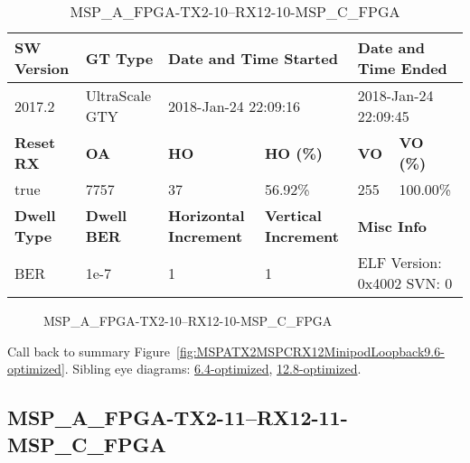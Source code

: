 \begin{table}[h]
\centering
\caption{MSP\_A\_FPGA-TX2-10--RX12-10-MSP\_C\_FPGA}
\label{tab:MSPAFPGATX210RX1210MSPCFPGA9.6-optimized}
\begin{tabular}{@{}|l|l|l|l|l|l|@{}}
\toprule
\textbf{SW Version}                & \textbf{GT Type}   & \multicolumn{2}{l|}{\textbf{Date and Time Started}}            & \multicolumn{2}{l|}{\textbf{Date and Time Ended}}        \\ \midrule
2017.2                       & UltraScale GTY          & \multicolumn{2}{l|}{2018-Jan-24 22:09:16}                   & \multicolumn{2}{l|}{2018-Jan-24 22:09:45}               \\ \midrule
\textbf{Reset RX}                  & \textbf{OA} & \textbf{HO}   & \textbf{HO (\%)} & \textbf{VO} & \textbf{VO (\%)} \\ \midrule
true & 7757        & 37          & 56.92\%        & 255        & 100.00\%       \\ \midrule
\textbf{Dwell Type}                & \textbf{Dwell BER} & \textbf{Horizontal Increment} & \textbf{Vertical Increment}    & \multicolumn{2}{l|}{\textbf{Misc Info}}                  \\ \midrule
BER                            & 1e-7        & 1        & 1           & \multicolumn{2}{l|}{ELF Version: 0x4002 SVN: 0}                         \\ \bottomrule
\end{tabular}
\end{table}

\begin{figure}[h]
\caption{MSP\_A\_FPGA-TX2-10--RX12-10-MSP\_C\_FPGA} \label{fig:MSPAFPGATX210RX1210MSPCFPGA9.6-optimized}
\end{figure}

Call back to summary Figure~\ref{fig:MSPATX2MSPCRX12MinipodLoopback9.6-optimized}.
Sibling eye diagrams: \hyperref[sec:MSPAFPGATX210RX1210MSPCFPGA6.4-optimized]{6.4-optimized}, \hyperref[sec:MSPAFPGATX210RX1210MSPCFPGA12.8-optimized]{12.8-optimized}.

\clearpage
\newpage


\subsection{MSP\_A\_FPGA-TX2-11--RX12-11-MSP\_C\_FPGA}\label{sec:MSPAFPGATX211RX1211MSPCFPGA9.6-optimized}

